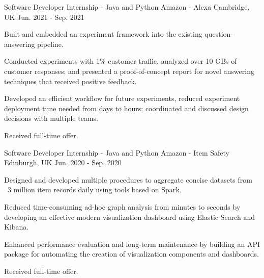 

\begin{cventries}


  \cventry
    {Software Developer Internship - Java and Python} %
    {Amazon - Alexa} %
    {Cambridge, UK} %
    {Jun. 2021 - Sep. 2021} %
    {
      \begin{cvitems} %
        \item {Built and embedded an experiment framework into the existing question-answering pipeline.}
        \item {Conducted experiments with 1\% customer traffic, analyzed over 10 GBs of customer responses; and presented a proof-of-concept report for novel answering techniques that received positive feedback.}
        \item {Developed an efficient workflow for future experiments, reduced experiment deployment time needed from days to hours; coordinated and discussed design decisions with multiple teams.}
        \item {Received full-time offer.}
      \end{cvitems}
    }

  \cventry
    {Software Developer Internship - Java and Python} %
    {Amazon - Item Safety} %
    {Edinburgh, UK} %
    {Jun. 2020 - Sep. 2020} %
    {
      \begin{cvitems} %
        \item {Designed and developed multiple procedures to aggregate concise datasets from ~3 million item records daily using tools based on Spark.}
        \item {Reduced time-consuming ad-hoc graph analysis from minutes to seconds by developing an effective modern visualization dashboard using Elastic Search and Kibana.}
        \item {Enhanced performance evaluation and long-term maintenance by building an API package for automating the creation of visualization components and dashboards.}
        \item {Received full-time offer.}
      \end{cvitems}
    }


\end{cventries}
